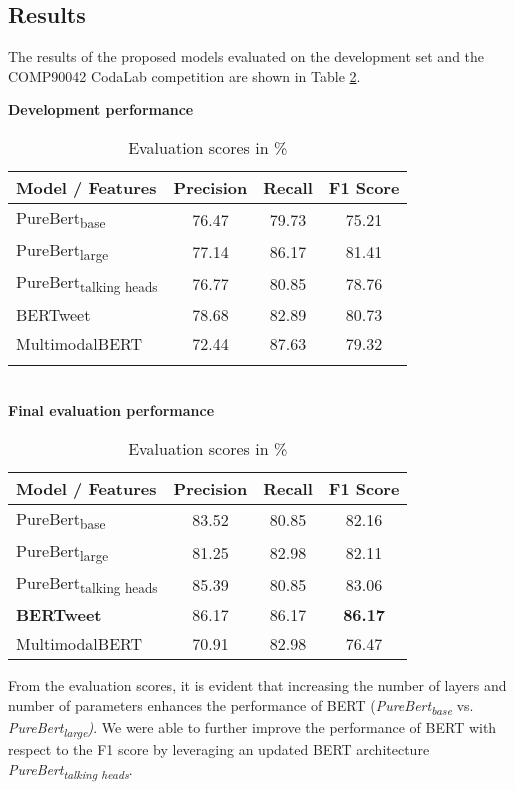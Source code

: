 \documentclass[11pt,a4paper]{article}
\begin{document}
\subsection{Results}
The results of the proposed models evaluated on the development set and the COMP90042 CodaLab competition are shown in Table \ref{tbl:evaluation_scores}.
\begin{table}
\centering
\small
\textbf{Development performance}
\setlength\tabcolsep{2pt}
\begin{tabular}{lccc}
\hline 
\textbf{Model / Features} & Precision & Recall & F1 Score \\ \hline
PureBert\textsubscript{base} & 76.47 & 79.73 & 75.21 \\ 
PureBert\textsubscript{large} & 77.14 & 86.17 & 81.41 \\ 
PureBert\textsubscript{talking heads} & 76.77 & 80.85 & 78.76 \\ %
BERTweet & 78.68 & 82.89 & 80.73 \\ %
MultimodalBERT & 72.44 & 87.63 & 79.32 \\ %
\hline \\
\end{tabular} 
\\
\textbf{Final evaluation performance}
\centering
\small
\setlength\tabcolsep{2pt}
\begin{tabular}{lccc}
\hline 
\textbf{Model / Features} & Precision & Recall & F1 Score \\ \hline
PureBert\textsubscript{base} & 83.52 & 80.85 & 82.16 \\ %
PureBert\textsubscript{large} & 81.25 & 82.98 & 82.11 \\ %
PureBert\textsubscript{talking heads} & 85.39 & 80.85 & 83.06 \\ %
\textbf{BERTweet} & 86.17 & 86.17 & \textbf{86.17} \\ %
MultimodalBERT  & 70.91 & 82.98 & 76.47 \\ %
\hline
\end{tabular}
\caption{Evaluation scores in \%}
\label{tbl:evaluation_scores}
\end{table}
From the evaluation scores, it is evident that increasing the number of layers  and number of parameters enhances the performance of BERT (\textit{PureBert\textsubscript{base}} vs. \textit{PureBert\textsubscript{large})}. We were able to further improve the performance of BERT with respect to the F1 score by leveraging an updated BERT architecture \textit{PureBert\textsubscript{talking heads}}.  
\end{document}
